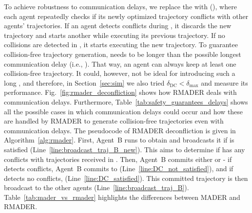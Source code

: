 To achieve robustness to communication delays, we replace the \RecheckStep{} with \DelayCheckStep{} (\DCStep{}), where each agent repeatedly checks if its newly optimized trajectory conflicts with other agents' trajectories.
If an agent detects conflicts during \DCStep{}, it discards the new trajectory and starts another \OStep{} while executing its previous trajectory. 
If no collisions are detected in \DCStep{}, it starts executing the new trajectory. 
To guarantee collision-free trajectory generation, \DCStep{} needs to be longer than the possible longest communication delay (i.e., \NeccessaryCond{}). 
That way, an agent can always keep at least one collision-free trajectory. 
It could, however, not be ideal for introducing such a long \delayParameter{}, and therefore, in Section~\ref{sec:sim} we also tried $\delta_{\text{DC}}<\delta_{\text{max}}$ and measure its performance. 
Fig.~\ref{fig:rmader_deconfliction} shows how RMADER deals with communication delays.
Furthermore, Table~\ref{tab:safety_guarantees_delays} shows all the possible cases in which communication delays could occur and how these are handled by RMADER to generate collision-free trajectories even with communication delays.
The pseudocode of RMADER deconfliction is given in Algorithm~\ref{alg:rmader}. First, Agent~B runs \OStep{} to obtain \trajBNew{} and broadcasts it if \CStep{} is satisfied 
(Line~\ref{line:broadcast_traj_B_new}). This \CStep{} aims to determine if \trajBNew{} has any conflicts with trajectories received in \OStep{}. Then, Agent~B commits either \trajBPrev{} or \trajBNew{} - if \DCStep{} detects conflicts, Agent~B commits to \trajBPrev{} (Line~\ref{line:DC_not_satisfied}), and if \DCStep{} detects no conflicts, \trajBNew{} (Line~\ref{line:DC_satisfied}). This committed trajectory is then broadcast to the other agents (Line~\ref{line:broadcast_traj_B}). Table~\ref{tab:mader_vs_rmader} highlights the differences between MADER and RMADER.

